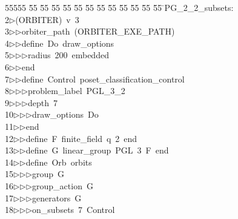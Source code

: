 %
%
\begin{tabbing}
55555 \= 55 \= 55 \= 55 \= 55 \= 55 \= 55 \= 55 \= 55 \= 55 \= 55 \= 55 \= 55 \= \>PG\_2\_2\_subsets:\\[0pt]
2\>$\triangleright$\>(ORBITER)\ v\ 3\ \\[0pt]
3\>$\triangleright$\>$\triangleright$\>orbiter\_path\ (ORBITER\_EXE\_PATH)\ \\[0pt]
4\>$\triangleright$\>$\triangleright$\>define\ Do\ draw\_options\ \\[0pt]
5\>$\triangleright$\>$\triangleright$\>$\triangleright$\>radius\ 200\ embedded\ \\[0pt]
6\>$\triangleright$\>$\triangleright$\>end\ \\[0pt]
7\>$\triangleright$\>$\triangleright$\>define\ Control\ poset\_classification\_control\ \\[0pt]
8\>$\triangleright$\>$\triangleright$\>$\triangleright$\>problem\_label\ PGL\_3\_2\ \\[0pt]
9\>$\triangleright$\>$\triangleright$\>$\triangleright$\>depth\ 7\ \\[0pt]
10\>$\triangleright$\>$\triangleright$\>$\triangleright$\>draw\_options\ Do\ \\[0pt]
11\>$\triangleright$\>$\triangleright$\>end\ \\[0pt]
12\>$\triangleright$\>$\triangleright$\>define\ F\ finite\_field\ q\ 2\ end\ \\[0pt]
13\>$\triangleright$\>$\triangleright$\>define\ G\ linear\_group\ PGL\ 3\ F\ end\ \\[0pt]
14\>$\triangleright$\>$\triangleright$\>define\ Orb\ orbits\ \\[0pt]
15\>$\triangleright$\>$\triangleright$\>$\triangleright$\>group\ G\ \\[0pt]
16\>$\triangleright$\>$\triangleright$\>$\triangleright$\>group\_action\ G\ \\[0pt]
17\>$\triangleright$\>$\triangleright$\>$\triangleright$\>generators\ G\ \\[0pt]
18\>$\triangleright$\>$\triangleright$\>$\triangleright$\>on\_subsets\ 7\ Control\ \\[0pt]

\end{tabbing}
